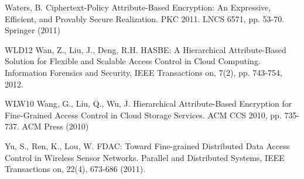 \documentclass[twocolumn]{svjour3}          \smartqed  \usepackage{graphicx}
\begin{document}
\begin{thebibliography}{11}
 Waters, B. Ciphertext-Policy Attribute-Based Encryption: An Expressive, Efficient, and Provably Secure Realization. PKC 2011. LNCS 6571, pp. 53-70. Springer (2011)

\bibitem
{WLD12} Wan, Z., Liu, J., Deng, R.H. HASBE: A Hierarchical Attribute-Based Solution for Flexible and Scalable Access Control in Cloud Computing. Information Forensics and Security, IEEE Transactions on, 7(2), pp. 743-754, 2012.

\bibitem
{WLW10} Wang, G., Liu, Q., Wu, J. Hierarchical Attribute-Based Encryption for Fine-Grained Access Control in Cloud Storage Services.  ACM CCS 2010, pp. 735-737. ACM Press (2010)

Yu, S., Ren, K., Lou, W. FDAC: Toward Fine-grained Distributed Data Access Control in Wireless Sensor Networks. Parallel and Distributed Systems, IEEE Transactions on, 22(4), 673-686 (2011).




\end{thebibliography}
\end{document}
